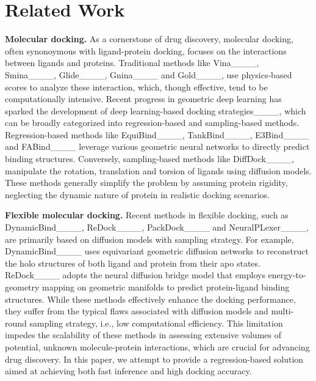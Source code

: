 \section{Related Work}
\label{Sec:RelatedWork}
\textbf{Molecular docking.} As a cornerstone of drug discovery, molecular docking, often synonoymous with ligand-protein docking, focuses on the interactions between ligands and proteins. Traditional methods like Vina____, Smina____, Glide____, Gnina____ and Gold____, use physics-based scores to analyze these interaction, which, though effective, tend to be computationally intensive. Recent progress in geometric deep learning has sparked the development of deep learning-based docking strategies____, which can be broadly categorized into regression-based and sampling-based methods. Regression-based methods like EquiBind____, TankBind____, E3Bind____ and FABind____ leverage various geometric neural networks to directly predict binding structures. Conversely, sampling-based methods like DiffDock____, manipulate the rotation, translation and torsion of ligands using diffusion models. These methods generally simplify the problem by assuming protein rigidity, neglecting the dynamic nature of protein in realistic docking scenarios.

\par
\textbf{Flexible molecular docking.} Recent methods in flexible docking, such as DynamicBind____, ReDock____, PackDock____ and NeuralPLexer____, are primarily based on diffusion models with sampling strategy. For example, DynamicBind____ uses equivariant geometric diffusion networks to reconstruct the holo structures of both ligand and protein from their apo states. ReDock____ adopts the neural diffusion bridge model that employs energy-to-geometry mapping on geometric manifolds to predict protein-ligand binding structures. While these methods effectively enhance the docking performance, they suffer from the typical flaws associated with diffusion models and multi-round sampling strategy, i.e., low computational efficiency. This limitation impedes the scalability of these methods in assessing extensive volumes of potential, unknown molecule-protein interactions, which are crucial for advancing drug discovery. In this paper, we attempt to provide a regression-based solution aimed at achieving both fast inference and high docking accuracy.